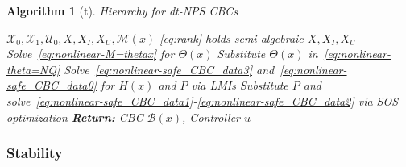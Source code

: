 \documentclass[sigconf]{acmart}
\newtheorem{algorithm}{Algorithm}
\begin{document}
\begin{algorithm}[t]
\caption{Hierarchy for dt-NPS CBCs}\label{alg:dt-nonlinear}
\begin{algorithmic}[1]
\Require $\mathcal{X}_0,\mathcal{X}_1,\mathcal{U}_0,X,X_I,X_U, \mathcal{M}(x)$
\Ensure \eqref{eq:rank} holds
\Ensure semi-algebraic $X,X_I,X_U$
\State Solve~\eqref{eq:nonlinear-M=thetax} for $\Theta(x)$
\State Substitute $\Theta(x)$ in~\eqref{eq:nonlinear-theta=NQ}
\State Solve~\eqref{eq:nonlinear-safe_CBC_data3} and~\eqref{eq:nonlinear-safe_CBC_data0} for $H(x)$ and $P$ via LMIs
\State Substitute $P$ and solve~\eqref{eq:nonlinear-safe_CBC_data1}-\eqref{eq:nonlinear-safe_CBC_data2} via SOS optimization
\noindent\Statex\textbf{Return:} CBC $\mathcal{B}(x)$, Controller $u$
\end{algorithmic}
\end{algorithm}


\subsubsection{Stability}
\end{document}
